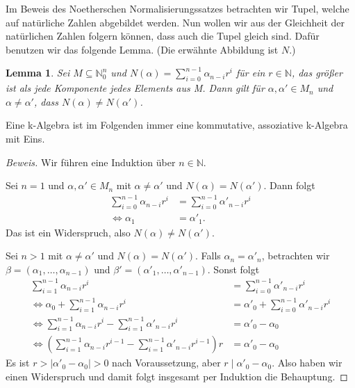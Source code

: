 \documentclass{article}
\newtheorem{lemma}[satz]{Lemma}
\begin{document}
	Im Beweis des Noetherschen Normalisierungssatzes betrachten wir Tupel,
	welche auf natürliche Zahlen abgebildet werden. Nun wollen wir aus der Gleichheit der natürlichen Zahlen folgern können, dass auch die Tupel gleich sind. Dafür benutzen wir das folgende Lemma. (Die erwähnte Abbildung ist \(N\).) 
	
	\begin{lemma}\label{tupelvergleich}
	Sei \(M \subseteq \mathbb{N}^n_0\) und \(N(\alpha) = \sum^{n-1}_{i=0}
	\alpha_{n-i}r^i\) für ein \(r \in \mathbb{N}\), das größer ist
	als jede Komponente jedes Elements aus M. Dann gilt für \(\alpha, \alpha'
	\in M_n\) und \(\alpha \neq \alpha'\), dass \(N(\alpha) \neq N(\alpha')\).
	\end{lemma}

	Eine k-Algebra ist im Folgenden immer eine kommutative, assoziative
	k-Algebra mit Eins.

	\begin{proof}[Beweis]
	Wir führen eine Induktion über \(n \in \mathbb{N}\).

	Sei \(n = 1\) und \(\alpha, \alpha' \in M_n\) mit \(\alpha \neq \alpha'\)
	und \(N(\alpha) = N(\alpha')\). Dann folgt
	\begin{align*} \sum^{n-1}_{i=0} \alpha_{n-i}r^i &= \sum^{n-1}_{i=0}
	\alpha'_{n-i}r^i \\ \Leftrightarrow \alpha_{1} &= \alpha'_{1}. \end{align*}
	Das ist ein Widerspruch, also \(N(\alpha) \neq N(\alpha')\).

	Sei \(n > 1\) mit \(\alpha \neq \alpha'\) und \(N(\alpha) = N(\alpha')\).
	Falls \(\alpha_n = \alpha'_n\), betrachten wir \(\beta = (\alpha_1,\ldots,
	\alpha_{n-1})\) und \(\beta' = (\alpha'_1,\ldots,\alpha'_{n-1})\).
	Sonst folgt
	\begin{align*} \sum^{n-1}_{i=1} \alpha_{n-i}r^i &= \sum^{n-1}_{i=0}
	\alpha'_{n-i}r^i \\
	\Leftrightarrow \alpha_0 + \sum^{n-1}_{i=1} \alpha_{n-i}r^i &=
	\alpha'_0 + \sum^{n-1}_{i=0} \alpha'_{n-i}r^i \\
	\Leftrightarrow \sum^{n-1}_{i=1} \alpha_{n-i}r^i - \sum^{n-1}_{i=1}
	\alpha'_{n-i}r^i &= \alpha'_0 - \alpha_0 \\
	\Leftrightarrow (\sum^{n-1}_{i=1} \alpha_{n-i}r^{i-1} - \sum^{n-1}_{i=1}
	\alpha'_{n-i}r^{i-1})r &= \alpha'_0 - \alpha_0
	\end{align*}
	Es ist \(r > |\alpha'_0 - \alpha_0| > 0\) nach Voraussetzung, aber
	\(r\;|\;\alpha'_0 - \alpha_0\). Also haben wir einen Widerspruch und damit
	folgt insgesamt per Induktion die Behauptung.
	\end{proof}
\end{document}
